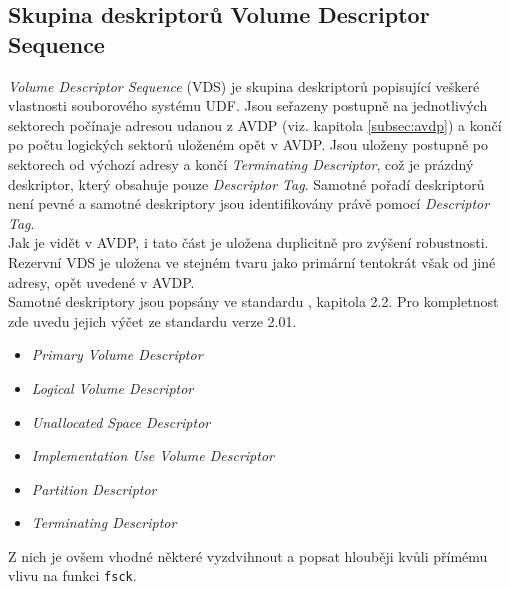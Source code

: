 \subsection{Skupina deskriptorů Volume Descriptor Sequence}
\label{subsec:vds}
\textit{Volume Descriptor Sequence} (VDS) je skupina deskriptorů popisující veškeré vlastnosti souborového systému UDF. Jsou seřazeny postupně na jednotlivých sektorech počínaje adresou udanou z AVDP (viz. kapitola \ref{subsec:avdp}) a končí po počtu logických sektorů uloženém opět v AVDP. Jsou uloženy postupně po sektorech od výchozí adresy a končí \textit{Terminating Descriptor}, což je prázdný deskriptor, který obsahuje pouze \textit{Descriptor Tag}. Samotné pořadí deskriptorů není pevné a samotné deskriptory jsou identifikovány právě pomocí \textit{Descriptor Tag}.\\
Jak je vidět v AVDP, i tato část je uložena duplicitně pro zvýšení robustnosti. Rezervní VDS je uložena ve stejném tvaru jako primární tentokrát však od jiné adresy, opět uvedené v AVDP.\\
Samotné deskriptory jsou popsány ve standardu \cite{osta-udf-0201}, kapitola 2.2. Pro kompletnost zde uvedu jejich výčet ze standardu verze 2.01.
\begin{itemize}
    \item \textit{Primary Volume Descriptor}
    \item \textit{Logical Volume Descriptor}
    \item \textit{Unallocated Space Descriptor}
    \item \textit{Implementation Use Volume Descriptor}
    \item \textit{Partition Descriptor}
    \item \textit{Terminating Descriptor}
\end{itemize}
Z nich je ovšem vhodné některé vyzdvihnout a popsat hlouběji kvůli přímému vlivu na funkci \texttt{fsck}.

